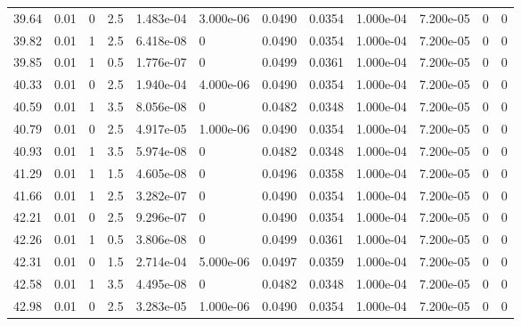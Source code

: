 \documentclass[preview]{standalone}
\begin{document}
{{{\begin{tabular}{L{1.2cm}C{1.2cm} C{0.3cm}C{0.5cm} C{1.4cm}C{1.4cm} C{1.4cm}C{1.4cm} C{1.6cm}C{1.6cm} C{1.6cm}C{1.6cm}}
  39.64  &  0.01  & 0     & 2.5 &  1.483e-04  & 3.000e-06  &  0.0490&   0.0354& 1.000e-04 & 7.200e-05   &  0 & 0  \\ 
  39.82  &  0.01  & 1     & 2.5 &  6.418e-08  & 0  &  0.0490&   0.0354& 1.000e-04 & 7.200e-05   &  0 & 0  \\ 
  39.85  &  0.01  & 1     & 0.5 &  1.776e-07  & 0  &  0.0499&   0.0361& 1.000e-04 & 7.200e-05   &  0 & 0  \\ 
  40.33  &  0.01  & 0     & 2.5 &  1.940e-04  & 4.000e-06  &  0.0490&   0.0354& 1.000e-04 & 7.200e-05   &  0 & 0  \\ 
  40.59  &  0.01  & 1     & 3.5 &  8.056e-08  & 0  &  0.0482&   0.0348& 1.000e-04 & 7.200e-05   &  0 & 0  \\ 
  40.79  &  0.01  & 0     & 2.5 &  4.917e-05  & 1.000e-06  &  0.0490&   0.0354& 1.000e-04 & 7.200e-05   &  0 & 0  \\ 
  40.93  &  0.01  & 1     & 3.5 &  5.974e-08  & 0  &  0.0482&   0.0348& 1.000e-04 & 7.200e-05   &  0 & 0  \\ 
  41.29  &  0.01  & 1     & 1.5 &  4.605e-08  & 0  &  0.0496&   0.0358& 1.000e-04 & 7.200e-05   &  0 & 0  \\ 
  41.66  &  0.01  & 1     & 2.5 &  3.282e-07  & 0  &  0.0490&   0.0354& 1.000e-04 & 7.200e-05   &  0 & 0  \\ 
  42.21  &  0.01  & 0     & 2.5 &  9.296e-07  & 0  &  0.0490&   0.0354& 1.000e-04 & 7.200e-05   &  0 & 0  \\ 
  42.26  &  0.01  & 1     & 0.5 &  3.806e-08  & 0  &  0.0499&   0.0361& 1.000e-04 & 7.200e-05   &  0 & 0  \\ 
  42.31  &  0.01  & 0     & 1.5 &  2.714e-04  & 5.000e-06  &  0.0497&   0.0359& 1.000e-04 & 7.200e-05   &  0 & 0  \\ 
  42.58  &  0.01  & 1     & 3.5 &  4.495e-08  & 0  &  0.0482&   0.0348& 1.000e-04 & 7.200e-05   &  0 & 0  \\ 
  42.98  &  0.01  & 0     & 2.5 &  3.283e-05  & 1.000e-06  &  0.0490&   0.0354& 1.000e-04 & 7.200e-05   &  0 & 0  \\ 
\hline 
\end{tabular} 

}}}
\end{document}
